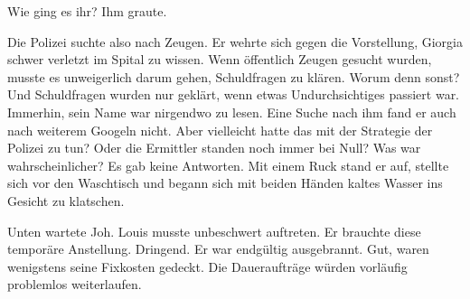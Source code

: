 Wie ging es ihr? Ihm graute.

Die Polizei suchte also nach Zeugen. Er wehrte sich gegen die
Vorstellung, Giorgia schwer verletzt im Spital zu wissen. Wenn
öffentlich Zeugen gesucht wurden, musste es unweigerlich darum gehen,
Schuldfragen zu klären. Worum denn sonst? Und Schuldfragen wurden nur
geklärt, wenn etwas Undurchsichtiges passiert war.
Immerhin, sein Name war nirgendwo zu lesen. Eine Suche nach ihm fand
er auch nach weiterem Googeln nicht. Aber vielleicht hatte das mit der
Strategie der Polizei zu tun? Oder die Ermittler standen noch immer bei
Null? Was war wahrscheinlicher?
Es gab keine Antworten. 
Mit einem Ruck stand er auf, stellte sich vor den Waschtisch und begann
sich mit beiden Händen kaltes Wasser ins Gesicht zu klatschen.

Unten wartete Joh. Louis musste unbeschwert auftreten. Er brauchte diese
temporäre Anstellung. Dringend. Er war endgültig ausgebrannt. Gut, waren wenigstens seine
Fixkosten gedeckt. Die Daueraufträge würden vorläufig problemlos weiterlaufen.




